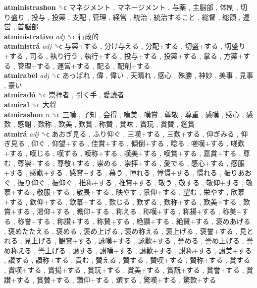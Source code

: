 \textbf{atministrashon} ␝ϲ   マネジメント ,  マネージメント ,  与薬 ,  主脳部 ,  体制 ,  切り盛り ,  投与 ,  投薬 ,  支配 ,  管理 ,  経営 ,  統治 ,  統治すること ,  総督 ,  総領 ,  運営 ,  首脳部   \\
\textbf{atministrativo} \emph{adj}  ␝ϲ   行政的   \\
\textbf{atministrá} \emph{adj}  ␝ϲ   与薬+する ,  分け与える ,  分配+する ,  切盛+する ,  切盛り+する ,  司る ,  執り行う ,  執行+する ,  投与+する ,  投薬+する ,  掌る ,  方薬+する ,  管理+する ,  運営+する ,  配る ,  配剤+する   \\
\textbf{atmirabel} \emph{adj}  ␝ϲ   あっぱれ ,  偉 ,  偉い ,  天晴れ ,  感心 ,  殊勝 ,  神妙 ,  美事 ,  見事 ,  豪い   \\
\textbf{atmiradó} ␝ϲ   崇拝者 ,  引く手 ,  愛読者   \\
\textbf{atmiral} ␝ϲ   大将   \\
\textbf{atmirashon} \emph{n}  ␝ϲ   三嘆 ,  了知 ,  会得 ,  嘆美 ,  嘆賞 ,  尊敬 ,  尊重 ,  感嘆 ,  感心 ,  感歎 ,  感謝 ,  歎称 ,  歎美 ,  歎賞 ,  称賛 ,  賞味 ,  賞玩 ,  賞賛 ,  鑑賞   \\
\textbf{atmirá} \emph{adj}  ␝ϲ   あおぎ見る ,  ふり仰ぐ ,  三嘆+する ,  三歎+する ,  仰ぎみる ,  仰ぎ見る ,  仰ぐ ,  仰望+する ,  佳賞+する ,  傾倒+する ,  唸る ,  嗟嘆+する ,  嗟歎+する ,  嘆じる ,  嘆ずる ,  嘆称+する ,  嘆美+する ,  嘆賞+する ,  嘉賞+する ,  尊む ,  尊崇+する ,  尊敬+する ,  崇める ,  崇拝+する ,  愛でる ,  感心+する ,  感服+する ,  感歎+する ,  感賞+する ,  慕う ,  憧れる ,  憧憬+する ,  憬れる ,  振りあおぐ ,  振り仰ぐ ,  振仰ぐ ,  推称+する ,  推賞+する ,  敬う ,  敬する ,  敬仰+する ,  敬慕+する ,  敬服+する ,  敬畏+する ,  映やす ,  景仰+する ,  望む ,  栄やす ,  欣慕+する ,  欽仰+する ,  欽慕+する ,  歎じる ,  歎ずる ,  歎称+する ,  歎美+する ,  歎賞+する ,  渇仰+する ,  瞻仰+する ,  称える ,  称嘆+する ,  称揚+する ,  称美+する ,  称誉+する ,  称讃+する ,  称賛+する ,  絶讃+する ,  絶賛+する ,  褒めあげる ,  褒めたたえる ,  褒める ,  褒め上げる ,  褒め称える ,  褒上げる ,  褒誉+する ,  見とれる ,  見上げる ,  観賞+する ,  詠嘆+する ,  詠歎+する ,  誉める ,  誉め上げる ,  誉め称える ,  誉上げる ,  讃する ,  讃嘆+する ,  讃歎+する ,  讃称+する ,  讃美+する ,  讚する ,  讚称+する ,  貴む ,  賛える ,  賛する ,  賛嘆+する ,  賛称+する ,  賞する ,  賞嘆+する ,  賞揚+する ,  賞玩+する ,  賞美+する ,  賞翫+する ,  賞誉+する ,  賞讃+する ,  賞賛+する ,  鑽仰+する ,  頌する ,  驚嘆+する ,  驚歎+する   \\
